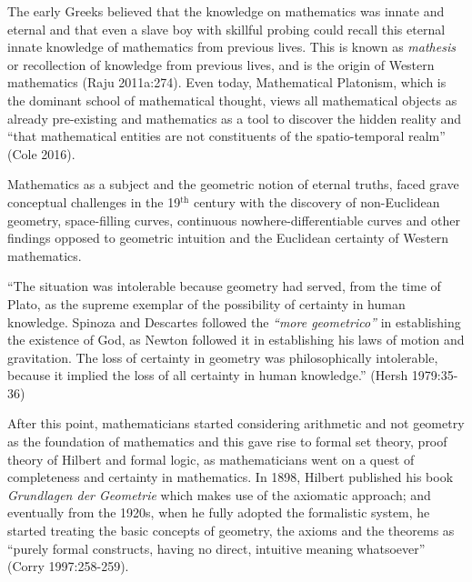 The early Greeks believed that the knowledge on mathematics was innate and eternal and that even a slave boy with skillful probing could recall this eternal innate knowledge of mathematics from previous lives. This is known as {\sl mathesis} or recollection of knowledge from previous lives, and is the origin of Western mathematics (Raju 2011a:274). Even today, Mathematical Platonism, which is the dominant school of mathematical thought, views all mathematical objects as already pre-existing and mathematics as a tool to discover the hidden reality and “that mathematical entities are not constituents of the spatio-temporal realm” (Cole 2016). 

Mathematics as a subject and the geometric notion of eternal truths, faced grave conceptual challenges in the 19$^{\text{th}}$ century with the discovery of non-Euclidean geometry, space-filling curves, continuous nowhere-differentiable curves and other findings opposed to geometric intuition and the Euclidean certainty of Western mathematics.
\begin{myquote}
``The situation was intolerable because geometry had served, from the time of Plato, as the supreme exemplar of the possibility of certainty in human knowledge. Spinoza and Descartes followed the {\sl``more geometrico''} in establishing the existence of God, as Newton followed it in establishing his laws of motion and gravitation. The loss of certainty in geometry was philosophically intolerable, because it implied the loss of all certainty in human knowledge.''	
\hfill (Hersh 1979:35-36)
\end{myquote}

After this point, mathematicians started considering arithmetic and not geometry as the foundation of mathematics and this gave rise to formal set theory, proof theory of Hilbert and formal logic, as mathematicians went on a quest of completeness and certainty in mathematics. In 1898, Hilbert published his book {\sl Grundlagen der Geometrie} which makes use of the axiomatic approach; and eventually from the 1920s, when he fully adopted the formalistic system, he started treating the basic concepts of geometry, the axioms and the theorems as “purely formal constructs, having no direct, intuitive meaning whatsoever” (Corry 1997:258-259).

